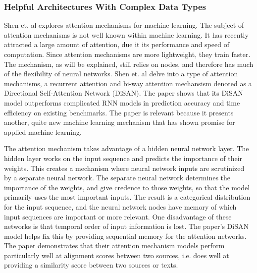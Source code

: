 \subsubsection{Helpful Architectures With Complex Data Types}
Shen et. al explores attention mechanisms for machine learning.  The subject of attention mechanisms is not well known within machine learning.  It has recently attracted a large amount of attention, due it its performance and speed of computation.  Since attention mechanisms are more lightweight, they train faster.  The mechanism, as will be explained, still relies on nodes, and therefore has much of the flexibility of neural networks.  Shen et. al delve into a type of attention mechanisms, a recurrent attention and bi-way attention mechansism denoted as a Directional Self-Attention Network (DiSAN).  The paper shows that its DiSAN model outperforms complicated RNN models in prediction accuracy and time efficiency on existing benchmarks.  The paper is relevant because it presents another, quite new machine learning mechanism that has shown promise for applied machine learning.

The attention mechanism takes advantage of a hidden neural network layer.  The hidden layer works on the input sequence and predicts the importance of their weights.  This creates a mechanism where neural network inputs are scrutinized by a separate neural network.  The separate neural network determines the importance of the weights, and give credence to those weights, so that the model primarily uses the most important inputs.  The result is a categorical distribution for the input sequence, and the neural network nodes have memory of which input sequences are important or more relevant.  One disadvantage of these networks is that temporal order of input information is lost.  The paper's DiSAN model helps fix this by providing sequential memory for the attention networks.  The paper demonstrates that their attention mechanism models perform particularly well at alignment scores between two sources, i.e. does well at providing a similarity score between two sources or texts.

